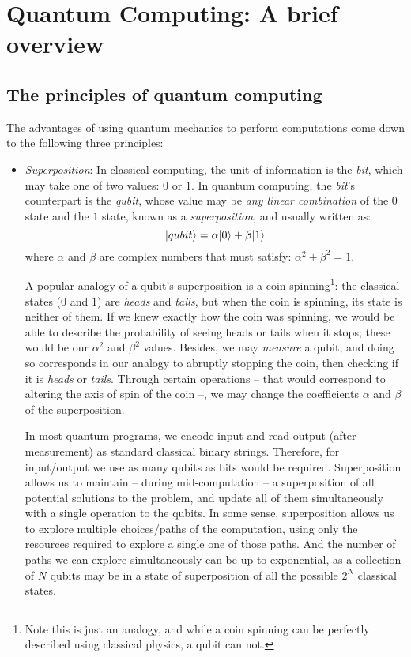\chapter{Quantum Computing: A brief overview}
\label{chap:Overview}

\section{The principles of quantum computing}
\label{Principles}

The advantages of using quantum mechanics to perform computations come down to the following three principles:

\begin{itemize}

\item \textit{Superposition}: In classical computing, the unit of information is the \textit{bit}, which may take one of two values: \(0\) or \(1\). In quantum computing, the \textit{bit}'s counterpart is the \textit{qubit}, whose value may be \textit{any linear combination} of the \(0\) state and the \(1\) state, known as a \textit{superposition}, and usually written as: \[\vert qubit \rangle = \alpha\vert 0 \rangle + \beta\vert 1 \rangle\] where \(\alpha\) and \(\beta\) are complex numbers that must satisfy: \(\alpha^2 + \beta^2 = 1\).

A popular analogy of a qubit's superposition is a coin spinning\footnote{Note this is just an analogy, and while a coin spinning can be perfectly described using classical physics, a qubit can not.}: the classical states (\(0\) and \(1\)) are \textit{heads} and \textit{tails}, but when the coin is spinning, its state is neither of them. If we knew exactly how the coin was spinning, we would be able to describe the probability of seeing heads or tails when it stops; these would be our \(\alpha^2\) and \(\beta^2\) values. Besides, we may \textit{measure} a qubit, and doing so corresponds in our analogy to abruptly stopping the coin, then checking if it is \textit{heads} or \textit{tails}. Through certain operations -- that would correspond to altering the axis of spin of the coin --, we may change the coefficients \(\alpha\) and \(\beta\) of the superposition. 

In most quantum programs, we encode input and read output (after measurement) as standard classical binary strings. Therefore, for input/output we use as many qubits as bits would be required. Superposition allows us to maintain -- during mid-computation -- a superposition of all potential solutions to the problem, and update all of them simultaneously with a single operation to the qubits. In some sense, superposition allows us to explore multiple choices/paths of the computation, using only the resources required to explore a single one of those paths. And the number of paths we can explore simultaneously can be up to exponential, as a collection of \(N\) qubits may be in a state of superposition of all the possible \(2^N\) classical states.


\end{itemize}

